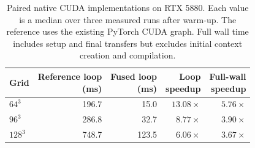 \begin{table}[tbp]
\centering
\small
\renewcommand{\arraystretch}{1.15}
\caption{Paired native CUDA implementations on RTX 5880. Each value is a median over three measured runs after warm-up. The reference uses the existing PyTorch CUDA graph. Full wall time includes setup and final transfers but excludes initial context creation and compilation.}
\label{tab:cuda-kernels}
\begin{tabular}{@{}lrrrr@{}}
\toprule
Grid & \shortstack{Reference loop\\(ms)} & \shortstack{Fused loop\\(ms)} & \shortstack{Loop\\speedup} & \shortstack{Full-wall\\speedup} \\
\midrule
$64^3$ & 196.7 & 15.0 & $13.08\times$ & $5.76\times$ \\
$96^3$ & 286.8 & 32.7 & $8.77\times$ & $3.90\times$ \\
$128^3$ & 748.7 & 123.5 & $6.06\times$ & $3.67\times$ \\
\bottomrule
\end{tabular}
\end{table}
